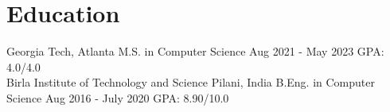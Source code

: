 \vspace{-2.5mm}
\section{Education}

\resumeSubHeadingListStart
\resumeEdu
{Georgia Tech, Atlanta} 
{M.S. in Computer Science} 
{Aug 2021 - May 2023} %
{GPA: 4.0/4.0} %
\\
\resumeEdu
{Birla Institute of Technology and Science Pilani, India} 
{B.Eng. in Computer Science} 
{Aug 2016 - July 2020} %
{GPA: 8.90/10.0} %
\resumeSubHeadingListEnd
\vspace{-3.5mm}